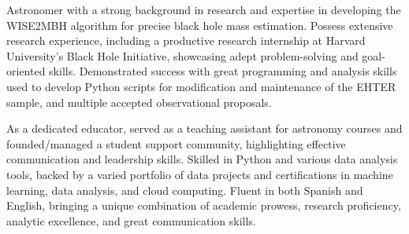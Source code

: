

\begin{cvparagraph}


Astronomer with a strong background in research and expertise in developing the WISE2MBH algorithm for precise black hole mass estimation. Possess extensive research experience, including a productive research internship at Harvard University's Black Hole Initiative, showcasing adept problem-solving and goal-oriented skills. Demonstrated success with great programming and analysis skills used to develop Python scripts for modification and maintenance of the EHTER sample, and multiple accepted observational proposals.

As a dedicated educator, served as a teaching assistant for astronomy courses and founded/managed a student support community, highlighting effective communication and leadership skills. Skilled in Python and various data analysis tools, backed by a varied portfolio of data projects and certifications in machine learning, data analysis, and cloud computing. Fluent in both Spanish and English, bringing a unique combination of academic prowess, research proficiency, analytic excellence, and great communication skills.
\end{cvparagraph}
